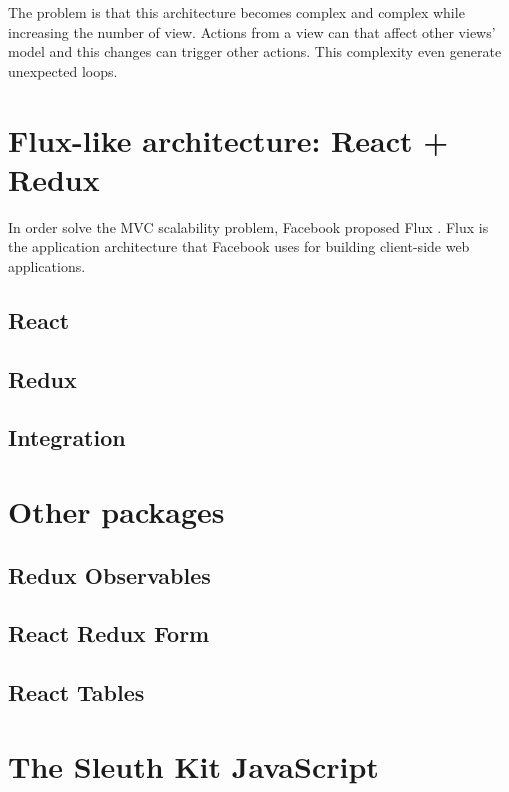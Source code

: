 The problem is that this architecture becomes complex and complex while 
increasing the number of view. Actions from a view can that affect other 
views' model and this changes can trigger other actions. This complexity even
generate unexpected loops.

\section{Flux-like architecture: React + Redux}

In order solve the MVC scalability problem, Facebook proposed Flux
\cite{flux-web}. Flux is the application architecture that Facebook uses for
building client-side web applications.



\subsection{React}

\subsection{Redux}

\subsection{Integration}

\section{Other packages}

\subsection{Redux Observables}

\subsection{React Redux Form}

\subsection{React Tables}

\section{The Sleuth Kit JavaScript}

